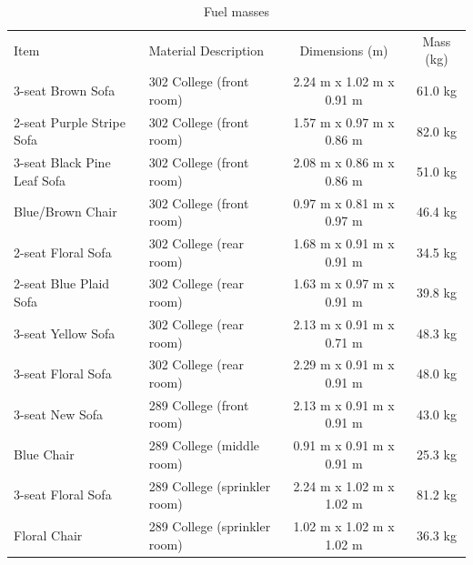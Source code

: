 \documentclass[12pt,oneside]{book}
\begin{document}
\begin{table}
\centering
\caption{Fuel masses}
\begin{tabular}{llcc}
\hline\noalign{\smallskip}
Item                         &  Material Description             &  Dimensions (m)            &  Mass (kg)  \\
\noalign{\smallskip}\hline\noalign{\smallskip}
3-seat Brown Sofa            &  302 College (front room)         &  2.24 m x 1.02 m x 0.91 m  &  61.0 kg    \\
2-seat Purple Stripe Sofa    &  302 College (front room)         &  1.57 m x 0.97 m x 0.86 m  &  82.0 kg    \\
3-seat Black Pine Leaf Sofa  &  302 College (front room)         &  2.08 m x 0.86 m x 0.86 m  &  51.0 kg    \\
Blue/Brown Chair             &  302 College (front room)         &  0.97 m x 0.81 m x 0.97 m  &  46.4 kg    \\
2-seat Floral Sofa           &  302 College (rear room)          &  1.68 m x 0.91 m x 0.91 m  &  34.5 kg    \\
2-seat Blue Plaid Sofa       &  302 College (rear room)          &  1.63 m x 0.97 m x 0.91 m  &  39.8 kg    \\
3-seat Yellow Sofa           &  302 College (rear room)          &  2.13 m x 0.91 m x 0.71 m  &  48.3 kg    \\
3-seat Floral Sofa           &  302 College (rear room)          &  2.29 m x 0.91 m x 0.91 m  &  48.0 kg    \\
3-seat New Sofa              &  289 College (front room)         &  2.13 m x 0.91 m x 0.91 m  &  43.0 kg    \\
Blue Chair                   &  289 College (middle room)        &  0.91 m x 0.91 m x 0.91 m  &  25.3 kg    \\
3-seat Floral Sofa           &  289 College (sprinkler room)     &  2.24 m x 1.02 m x 1.02 m  &  81.2 kg    \\
Floral Chair                 &  289 College (sprinkler room)     &  1.02 m x 1.02 m x 1.02 m  &  36.3 kg    \\

\end{tabular}
\end{table}
\end{document}
